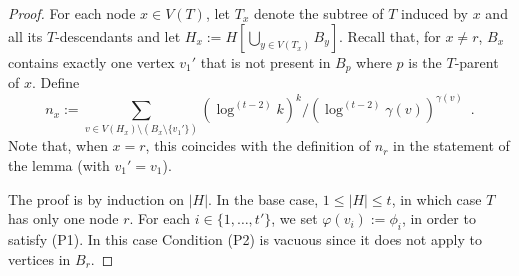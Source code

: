 \documentclass[kpfonts]{patmorin}
\theoremstyle{named}
\begin{document}
\begin{proof}
    For each node $x\in V(T)$, let $T_x$ denote the subtree of $T$ induced by $x$ and all its $T$-descendants and let $H_x:=H[\bigcup_{y\in V(T_x)} B_y]$. Recall that, for $x\neq r$, $B_x$ contains exactly one vertex $v_1'$ that is not present in $B_p$ where $p$ is the $T$-parent of $x$.  Define
    \[
        n_x:=\sum_{v\in V(H_x)\setminus (B_x\setminus \{v_1'\})}(\log^{(t-2)} k)^k/(\log^{(t-2)}\gamma(v))^{\gamma(v)} \enspace .
    \]
    Note that, when $x=r$, this coincides with the definition of $n_r$ in the statement of the lemma (with $v_1'=v_1$).

    The proof is by induction on $|H|$.  In the base case, $1\le|H|\le t$, in which case $T$ has only one node $r$. For each $i\in\{1,\ldots,t'\}$, we set $\varphi(v_i):=\phi_i$, in order to satisfy (P1).  In this case Condition (P2) is vacuous since it does not apply to vertices in $B_r$.


\end{proof}
\end{document}
